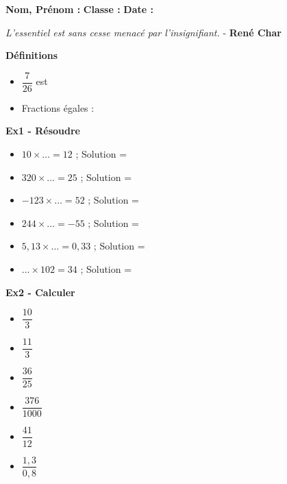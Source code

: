 \newpage


\textbf{Nom, Prénom :} \hspace{8cm} \textbf{Classe :} \hspace{3cm} \textbf{Date :}\\

\begin{center}
  \textit{L’essentiel est sans cesse menacé par l’insignifiant.} - \textbf{René Char}
\end{center}

\textbf{Définitions}

\begin{itemize}[label={$\bullet$}]
  \item $\dfrac{7}{26}$ est \dotfill \\ \Pointilles[1] 
  \item Fractions égales : \dotfill \\ \Pointilles[1] 
\end{itemize}

\textbf{Ex1 - Résoudre}

\begin{multicols}{2}
\begin{itemize}[label={$\bullet$}]
  \item $ 10 \times \ldots = 12 $ ; Solution = \dotfill \\
  \item $ 320 \times \ldots = 25$ ; Solution = \dotfill \\
  \item $ -123 \times \ldots = 52$ ; Solution = \dotfill \\
  \item $ 244 \times \ldots = -55$ ; Solution = \dotfill \\
  \item $ 5,13 \times \ldots = 0,33$ ; Solution = \dotfill \\
  \item $ \ldots \times 102 = 34$ ; Solution = \dotfill \\
\end{itemize}
\end{multicols}

\textbf{Ex2 - Calculer}

\begin{multicols}{3}
\begin{itemize}[label={$\bullet$}]
  \item $\dfrac{10}{3}$ \dotfill \\
  \item $\dfrac{11}{3}$ \dotfill \\
  \item $\dfrac{36}{25}$ \dotfill \\
  \item $\dfrac{376}{1000}$ \dotfill \\
  \item $\dfrac{41}{12}$ \dotfill \\
  \item $\dfrac{1,3}{0,8}$ \dotfill \\
\end{itemize}
\end{multicols}

